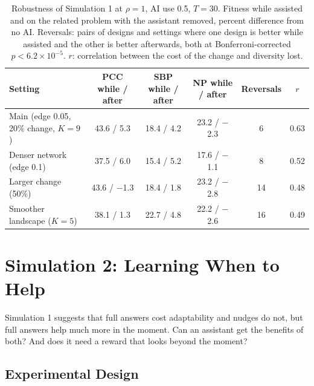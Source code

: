 \documentclass[11pt]{article}
\begin{document}
\begin{table}[t]
\centering
\small
\caption{Robustness of Simulation 1 at $\rho=1$, AI use 0.5, $T=30$. Fitness while assisted and on the related problem with the assistant removed, percent difference from no AI. Reversals: pairs of designs and settings where one design is better while assisted and the other is better afterwards, both at Bonferroni-corrected $p<6.2\times10^{-5}$. $r$: correlation between the cost of the change and diversity lost.}
\label{tab:robust}
\begin{tabular}{lccccc}
\toprule
Setting & PCC while / after & SBP while / after & NP while / after & Reversals & $r$ \\
\midrule
Main (edge 0.05, 20\% change, $K=9$) & 43.6 / 5.3 & 18.4 / 4.2 & 23.2 / $-$2.3 & 6 & 0.63 \\
Denser network (edge 0.1) & 37.5 / 6.0 & 15.4 / 5.2 & 17.6 / $-$1.1 & 8 & 0.52 \\
Larger change (50\%) & 43.6 / $-$1.3 & 18.4 / 1.8 & 23.2 / $-$2.8 & 14 & 0.48 \\
Smoother landscape ($K=5$) & 38.1 / 1.3 & 22.7 / 4.8 & 22.2 / $-$2.6 & 16 & 0.49 \\
\bottomrule
\end{tabular}
\end{table}

\section{Simulation 2: Learning When to Help}
\label{sec:sim2}

Simulation 1 suggests that full answers cost adaptability and nudges do not, but full answers help much more in the moment. Can an assistant get the benefits of both? And does it need a reward that looks beyond the moment?

\subsection{Experimental Design}
\end{document}
